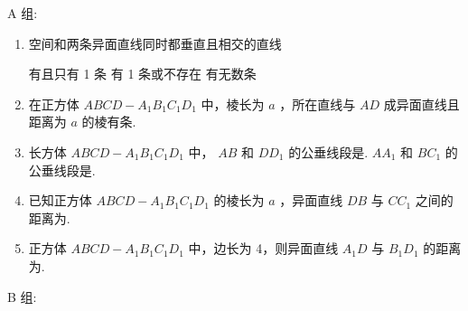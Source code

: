 A 组:

\begin{enumerate}

\item 空间和两条异面直线同时都垂直且相交的直线

 {有且只有 1 条} {有 1 条或不存在} {有无数条}

\item 在正方体 $ {ABCD} - {A}_{1}{B}_{1}{C}_{1}{D}_{1} $ 中，棱长为 $ a $ ，所在直线与 $ {AD} $ 成异面直线且距离为 $ a $ 的棱有条.

\item 长方体 $ {{ABCD}} - {{A}}_{1}{{B}}_{1}{{C}}_{1}{{D}}_{1} $ 中， $ {{AB}} $ 和 $ {D{D}_{1}} $ 的公垂线段是. $ {A}{{A}}_{1} $ 和 $ {B}{{C}}_{1} $ 的公垂线段是.

\item 已知正方体 $ {ABCD} - {A}_{1}{B}_{1}{C}_{1}{D}_{1} $ 的棱长为 $ a $ ，异面直线 $ {DB} $ 与 $ C{C}_{1} $ 之间的距离为.

\item 正方体 $ {{ABCD}} - {{A}}_{1}{{B}}_{1}{{C}}_{1}{{D}}_{1} $ 中，边长为 4，则异面直线 $ {{A}}_{1}{D} $ 与 $ {{B}}_{1}{{D}}_{1} $ 的距离为.

    
\end{enumerate}


B 组:

